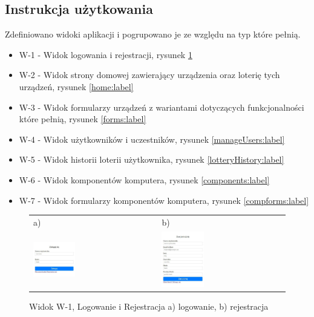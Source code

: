 \subsection{Instrukcja użytkowania}

Zdefiniowano widoki aplikacji i pogrupowano je ze względu na typ które pełnią.
\begin{itemize}
	\item W-1 - Widok logowania i rejestracji, rysunek \ref{authview:label}
	\item W-2 - Widok strony domowej zawierający urządzenia oraz loterię tych urządzeń, rysunek \ref{home:label}
	\item W-3 - Widok formularzy urządzeń z wariantami dotyczących funkcjonalności które pełnią, rysunek \ref{forms:label}
	\item W-4 - Widok użytkowników i uczestników, rysunek \ref{manageUsers:label}
	\item W-5 - Widok historii loterii użytkownika, rysunek \ref{lotteryHistory:label}
	\item W-6 - Widok komponentów komputera, rysunek \ref{components:label}
	\item W-7 - Widok formularzy komponentów komputera, rysunek \ref{compforms:label}
\end{itemize} 





\begin{figure}[htb]
  \centering
	\begin{tabular}{@{}ll@{}}
	a) & b) \\
  \includegraphics[width=0.35\textwidth]{rys05/view/login.pdf} & 
	\includegraphics[width=0.35\textwidth]{rys05/view/register.pdf}
	\end{tabular}
  \caption{Widok W-1, Logowanie i Rejestracja a) logowanie, b) rejestracja}
  \label{authview:label}
\end{figure}


